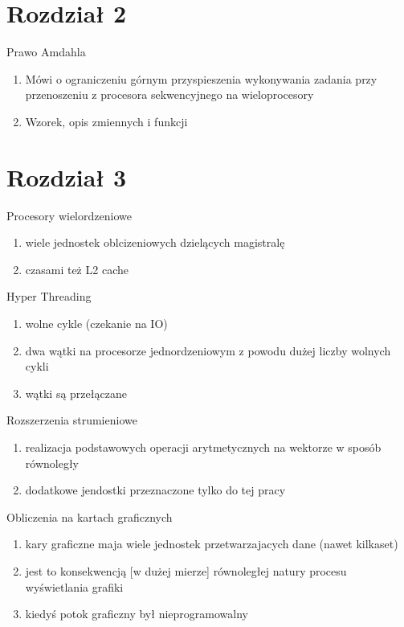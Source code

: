 \documentclass{beamer}
\begin{document}
\section{Rozdział 2}

\begin{frame}{Prawo Amdahla}
  \begin{enumerate}
  \item Mówi o ograniczeniu górnym przyspieszenia wykonywania zadania przy przenoszeniu z procesora sekwencyjnego na wieloprocesory
  \item Wzorek, opis zmiennych i funkcji
  \end{enumerate}
\end{frame}
\section{Rozdział 3}


\begin{frame}{Procesory wielordzeniowe}
  \begin{enumerate}
  \item wiele jednostek oblcizeniowych dzielących magistralę
  \item czasami też L2 cache
  \end{enumerate}
\end{frame}

\begin{frame}{Hyper Threading}
  \begin{enumerate}
  \item wolne cykle (czekanie na IO)
  \item dwa wątki na procesorze jednordzeniowym z powodu dużej liczby wolnych cykli
  \item wątki są przełączane
  \end{enumerate}
\end{frame}

\begin{frame}{Rozszerzenia strumieniowe}
  \begin{enumerate}
  \item realizacja podstawowych operacji arytmetycznych na wektorze w sposób równoległy
  \item dodatkowe jendostki przeznaczone tylko do tej pracy
  \end{enumerate}
\end{frame}

\begin{frame}{Obliczenia na kartach graficznych}
  \begin{enumerate}
  \item kary graficzne maja wiele jednostek przetwarzajacych dane (nawet kilkaset)
  \item jest to konsekwencją [w dużej mierze] równoległej natury procesu wyświetlania grafiki
  \item kiedyś potok graficzny był nieprogramowalny
  \end{enumerate}
\end{frame}
\end{document}
